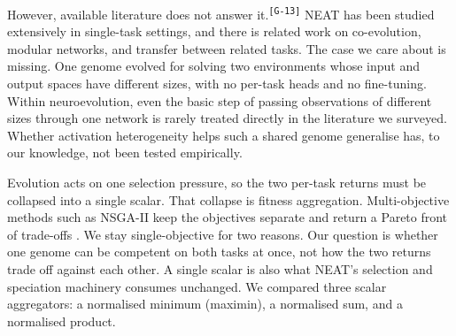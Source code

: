 \documentclass[12pt]{article}
\newcommand{\revID}[1]{\textsuperscript{\scriptsize\texttt{[#1]}}}
\newcommand{\revGram}[2]{\textcolor{lrRed}{#2}\revID{#1}}       %
\begin{document}
% 

\revGram{G-13}{However, available literature does not answer it.}
NEAT has been studied extensively in single-task settings, and there is related work on co-evolution, modular networks, and transfer between related tasks.
The case we care about is missing. One genome evolved for solving two environments whose input and output spaces have different sizes, with no per-task heads and no fine-tuning.
Within neuroevolution, even the basic step of passing observations of different sizes through one network is rarely treated directly in the literature we surveyed.
Whether activation heterogeneity helps such a shared genome generalise has, to our knowledge, not been tested empirically.

Evolution acts on one selection pressure, so the two per-task returns must be collapsed into a single scalar. That collapse is fitness aggregation.
Multi-objective methods such as NSGA-II keep the objectives separate and return a Pareto front of trade-offs \parencite{deb_fast_2002}.
We stay single-objective for two reasons. Our question is whether one genome can be competent on both tasks at once, not how the two returns trade off against each other. A single scalar is also what NEAT's selection and speciation machinery consumes unchanged.
We compared three scalar aggregators: a normalised minimum (maximin), a normalised sum, and a normalised product.

\end{document}
